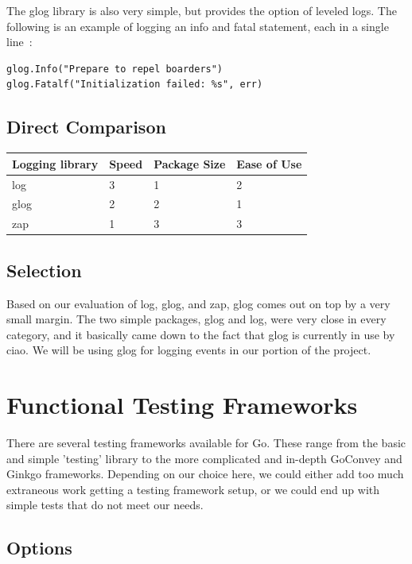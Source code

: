\documentclass[10pt,letterpaper,onecolumn,journal]{IEEEtran}
\begin{document}
The glog library is also very simple, but provides the option of leveled logs.
The following is an example of logging an info and fatal statement, each in a
single line~\cite{glog}:

\begin{lstlisting}
glog.Info("Prepare to repel boarders")
glog.Fatalf("Initialization failed: %s", err)
\end{lstlisting}

\subsection{Direct Comparison}

\begin{center}
	\begin{tabular}{| l | l | l | l |}
		\hline
		Logging library & Speed & Package Size & Ease of Use
		\\ \hline
		log  & 3 & 1 & 2 \\ \hline
		glog & 2 & 2 & 1 \\ \hline
		zap  & 1 & 3 & 3 \\ \hline
	\end{tabular}
\end{center}

\subsection{Selection}

Based on our evaluation of log, glog, and zap, glog comes out on top by a very
small margin. The two simple packages, glog and log, were very close in every
category, and it basically came down to the fact that glog is currently in use
by ciao. We will be using glog for logging events in our portion of the project.

\section{Functional Testing Frameworks}

There are several testing frameworks available for Go. These range from the
basic and simple 'testing' library to the more complicated and in-depth GoConvey
and Ginkgo frameworks. Depending on our choice here, we could either add too
much extraneous work getting a testing framework setup, or we could end up with
simple tests that do not meet our needs.

\subsection{Options}
\end{document}
